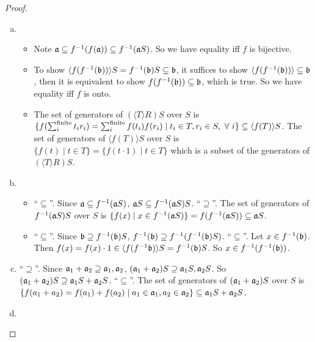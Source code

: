 \begin{proof}
    \begin{enumerate}[(a)]
        \item 
            \begin{itemize}
                \item 
                    Note $\mathfrak{a} \subseteq f^{-1}(f(\mathfrak{a})) \subseteq f^{-1}(\mathfrak{a} S)$. So we have equality iff $f$ is bijective.
                \item 
                    To show $\langle f(f^{-1}(\mathfrak{b})) \rangle S = f^{-1}(\mathfrak{b})S \subseteq \mathfrak{b}$, it suffices to show $\langle f(f^{-1}(\mathfrak{b})) \rangle \subseteq \mathfrak{b}$, then it is equivalent to show $f(f^{-1}(\mathfrak{b})) \subseteq \mathfrak{b}$, which is true. So we have equality iff $f$ is onto.
                \item 
                    The set of generators of $(\langle T \rangle R)S$ over $S$ is $\{f(\sum_i^{\text{finite}}t_ir_i) = \sum_i^{\text{finite}} f(t_i)f(r_i) \mid t_i \in T,r_i \in S,\ \forall \  i\} \subseteq \langle f(T) \rangle S$. The set of generators of $\langle f(T) \rangle S$ over $S$ is $\{f(t) \mid t \in T\} = \{f(t \cdot 1) \mid t \in T\}$ which is a subset of the generators of $(\langle T \rangle R)S$.
            \end{itemize}
        \item 
            \begin{itemize}
                \item 
                    ``$\subseteq$''. Since $\mathfrak{a} \subseteq f^{-1}(\mathfrak{a} S)$, $\mathfrak{a} S \subseteq f^{-1}(\mathfrak{a} S)S$. ``$\supseteq$''. The set of generators of $f^{-1}(\mathfrak{a} S)S$ over $S$ is $\{f(x) \mid x \in f^{-1}(\mathfrak{a} S)\} = f(f^{-1}(\mathfrak{a} S)) \subseteq \mathfrak{a} S$.
                \item 
                    ``$\subseteq$''. Since $\mathfrak{b} \supseteq f^{-1}(\mathfrak{b})S$, $f^{-1}(\mathfrak{b}) \supseteq f^{-1}(f^{-1}(\mathfrak{b})S)$. ``$\subseteq$''. Let $x \in f^{-1}(\mathfrak{b})$. Then $f(x) = f(x) \cdot 1 \in \langle f(f^{-1}\mathfrak{b}) \rangle S = f^{-1}(\mathfrak{b})S$. So $x \in f^{-1}(f^{-1}(\mathfrak{b}))$.
            \end{itemize}
        \item ``$\supseteq$''. Since $\mathfrak{a}_1 + \mathfrak{a}_2 \supseteq \mathfrak{a}_1,\mathfrak{a}_2$, $(\mathfrak{a}_1+\mathfrak{a}_2)S \supseteq \mathfrak{a}_1S,\mathfrak{a}_2S$. So $(\mathfrak{a}_1+\mathfrak{a}_2)S \supseteq \mathfrak{a}_1S + \mathfrak{a}_2S$. ``$\subseteq$''. The set of generators of $(\mathfrak{a}_1+\mathfrak{a}_2)S$ over $S$ is $\{f(a_1+a_2) = f(a_1) + f(a_2) \mid a_1 \in \mathfrak{a}_1,a_2 \in \mathfrak{a}_2\} \subseteq \mathfrak{a}_1 S + \mathfrak{a}_2 S$.         
        \item 

\end{enumerate}
\end{proof}
